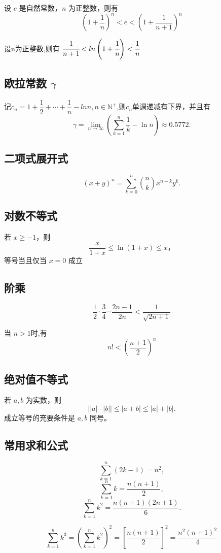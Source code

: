 \documentclass{article}
\numberwithin{equation}{section}
\begin{document}
设 $e$ 是自然常数，$n$ 为正整数，则有
\[
 \left(1 + \frac{1}{n}\right)^n  < e < \left(1 + \frac{1}{n+1}\right)^n
\]

设n为正整数,则有 \( \cfrac{1}{n+1} < ln\left(1 + \cfrac{1}{n} \right) < \cfrac{1}{n} \)

\subsection{欧拉常数 $\gamma$}
记\( c_n = 1 + \dfrac{1}{2} + \cdots + \dfrac{1}{n} - lnn, n \in \mathbb{N}^+ \),则\(c_n\)单调递减有下界，并且有
\[
\gamma = \lim_{n \to \infty} \left( \sum_{k=1}^n \dfrac{1}{k} - \ln n \right) \approx 0.5772.
\]

\subsection{二项式展开式}
\[
(x + y)^n = \sum_{k=0}^n \binom{n}{k} x^{n-k} y^k.
\]

\subsection{对数不等式}
若 $x \geq -1$，则
\[
\frac{x}{1+x} \leq \ln(1+x) \leq x，
\]
等号当且仅当 $x = 0$ 成立

\subsection{阶乘}

\[ \frac{1}{2} \cdot \frac{3}{4} \cdots \frac{2n-1}{2n} < \frac{1}{\sqrt{2n+1}} \]

当 \( n > 1 \)时,有$$ n! < \left(\dfrac{n+1}{2} \right)^n $$

\subsection{绝对值不等式}
若 $a, b$ 为实数，则
\[
| |a| - |b| | \leq |a + b| \leq |a| + |b|.
\]
成立等号的充要条件是 $a, b$ 同号。

\subsection{常用求和公式}
\[
\sum_{k=1}^n (2k-1) = n^2,
\]
\[
\sum_{k=1}^n k = \frac{n(n+1)}{2},
\]
\[
\sum_{k=1}^n k^2 = \frac{n(n+1)(2n+1)}{6}.
\]

\[
\sum_{k=1}^n k^3 = \left(\sum_{k=1}^n k^2\right)^2 = \left[ \frac{n(n+1)}{2} \right]^2 = \frac{n^2(n+1)^2}{4}
\]
\end{document}
